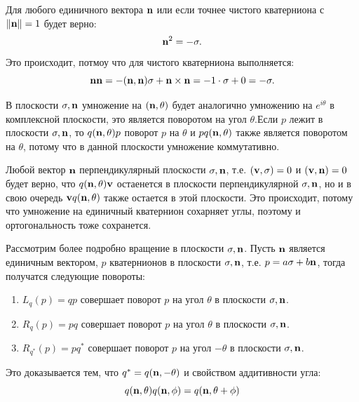 Для любого единичного вектора $\vb{n}$ или если точнее чистого кватерниона с $\|\vb{n}\| = 1$ будет верно:
\begin{equation*}
    \vb{n}^2 = -\sigma.
\end{equation*}
Это происходит, потмоу что для чистого кватерниона выполняется: 
\begin{equation*}
    \vb{n}\vb{n} = -(\vb{n},\vb{n})\sigma + \vb{n}\times\vb{n} = -1\cdot\sigma + 0 = -\sigma.
\end{equation*}

В плоскости $\sigma, \vb{n}$ умножение на $(\vb{n}, \theta)$ будет аналогично умножению на $e^{i\theta}$ в комплексной плоскости, это является поворотом на угол $\theta$.Если $p$ лежит в плоскости $\sigma, \vb{n}$, то $q(\vb{n}, \theta) p$ поворот $p$ на $\theta$ и $p q(\vb{n}, \theta)$ также является поворотом на $\theta$, потому что в данной плоскости умножение коммутативно.

Любой вектор $\vb{n}$ перпендикулярный плоскости $\sigma, \vb{n}$, т.е. $(\vb{v}, \sigma) = 0$ и $(\vb{v}, \vb{n}) = 0$ будет верно, что $q(\vb{n}, \theta) \vb{v}$ остаенется в плоскости перпендикулярной $\sigma, \vb{n}$, но и в свою очередь $\vb{v} q(\vb{n}, \theta)$ также остается в этой плоскости. Это происходит, потому что умножение на единичный кватернион сохарняет углы, поэтому и ортогональность тоже сохранется.

Рассмотрим более подробно вращение в плоскости $\sigma, \vb{n}$. Пусть $\vb{n}$ является единичным вектором, $p$ кватернионов в плоскости $\sigma, \vb{n}$, т.е. $p = a\sigma + b\vb{n}$, тогда получатся следующие повороты:
\begin{enumerate}
    \item $L_{q}(p) = q p$ совершает поворот $p$ на угол $\theta$ в плоскости $\sigma, \vb{n}$.
    \item $R_{q}(p) = p q$ совершает поворот $p$ на угол $\theta$ в плоскости $\sigma, \vb{n}$.
    \item $R_{q^*}(p) = p q^*$ совершает поворот $p$ на угол $-\theta$ в плоскости $\sigma, \vb{n}$.
\end{enumerate}
Это доказывается тем, что $q^* = q(\vb{n}, -\theta)$ и свойством аддитивности угла:
\begin{equation*}
    q(\vb{n}, \theta) q(\vb{n}, \phi) = q(\vb{n}, \theta + \phi)
\end{equation*}

